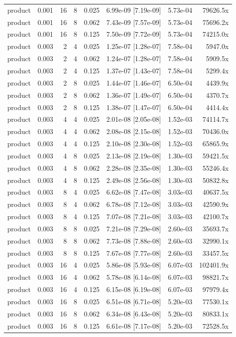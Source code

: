 \begin{tabular}{lrrrrrrr}
product & 0.001 & 16 & 8 & 0.025 & 6.99e-09 [7.19e-09] & 5.73e-04 & 79626.5x \\
product & 0.001 & 16 & 8 & 0.062 & 7.43e-09 [7.57e-09] & 5.73e-04 & 75696.2x \\
product & 0.001 & 16 & 8 & 0.125 & 7.50e-09 [7.72e-09] & 5.73e-04 & 74215.0x \\
product & 0.003 & 2 & 4 & 0.025 & 1.25e-07 [1.28e-07] & 7.58e-04 & 5947.0x \\
product & 0.003 & 2 & 4 & 0.062 & 1.24e-07 [1.28e-07] & 7.58e-04 & 5909.5x \\
product & 0.003 & 2 & 4 & 0.125 & 1.37e-07 [1.43e-07] & 7.58e-04 & 5299.4x \\
product & 0.003 & 2 & 8 & 0.025 & 1.44e-07 [1.46e-07] & 6.50e-04 & 4439.9x \\
product & 0.003 & 2 & 8 & 0.062 & 1.36e-07 [1.49e-07] & 6.50e-04 & 4370.7x \\
product & 0.003 & 2 & 8 & 0.125 & 1.38e-07 [1.47e-07] & 6.50e-04 & 4414.4x \\
product & 0.003 & 4 & 4 & 0.025 & 2.01e-08 [2.05e-08] & 1.52e-03 & 74114.7x \\
product & 0.003 & 4 & 4 & 0.062 & 2.08e-08 [2.15e-08] & 1.52e-03 & 70436.0x \\
product & 0.003 & 4 & 4 & 0.125 & 2.10e-08 [2.30e-08] & 1.52e-03 & 65865.9x \\
product & 0.003 & 4 & 8 & 0.025 & 2.13e-08 [2.19e-08] & 1.30e-03 & 59421.5x \\
product & 0.003 & 4 & 8 & 0.062 & 2.28e-08 [2.35e-08] & 1.30e-03 & 55246.4x \\
product & 0.003 & 4 & 8 & 0.125 & 2.49e-08 [2.56e-08] & 1.30e-03 & 50832.8x \\
product & 0.003 & 8 & 4 & 0.025 & 6.62e-08 [7.47e-08] & 3.03e-03 & 40637.5x \\
product & 0.003 & 8 & 4 & 0.062 & 6.78e-08 [7.12e-08] & 3.03e-03 & 42590.9x \\
product & 0.003 & 8 & 4 & 0.125 & 7.07e-08 [7.21e-08] & 3.03e-03 & 42100.7x \\
product & 0.003 & 8 & 8 & 0.025 & 7.21e-08 [7.29e-08] & 2.60e-03 & 35693.7x \\
product & 0.003 & 8 & 8 & 0.062 & 7.73e-08 [7.88e-08] & 2.60e-03 & 32990.1x \\
product & 0.003 & 8 & 8 & 0.125 & 7.67e-08 [7.77e-08] & 2.60e-03 & 33457.5x \\
product & 0.003 & 16 & 4 & 0.025 & 5.86e-08 [5.93e-08] & 6.07e-03 & 102401.9x \\
product & 0.003 & 16 & 4 & 0.062 & 5.78e-08 [6.14e-08] & 6.07e-03 & 98821.7x \\
product & 0.003 & 16 & 4 & 0.125 & 6.15e-08 [6.19e-08] & 6.07e-03 & 97979.4x \\
product & 0.003 & 16 & 8 & 0.025 & 6.51e-08 [6.71e-08] & 5.20e-03 & 77530.1x \\
product & 0.003 & 16 & 8 & 0.062 & 6.34e-08 [6.43e-08] & 5.20e-03 & 80833.1x \\
product & 0.003 & 16 & 8 & 0.125 & 6.61e-08 [7.17e-08] & 5.20e-03 & 72528.5x \\
\bottomrule
\end{tabular}\hspace{2em}%
